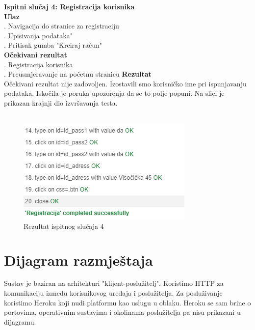 {			 \noindent \textbf{Ispitni slučaj 4: Registracija korisnika}
			 \\
			 \textbf{Ulaz}
			 \\
			 . Navigacija do stranice za registraciju \\
			 . Upisivanja podataka" \\
			 . Pritisak gumba "Kreiraj račun" \\
			 \textbf{Očekivani rezultat}
			 \\
			 . Registracija korisnika\\
			 . Preusmjeravanje na početnu stranicu
			 \textbf{Rezultat}
			 \\
			 \indent Očekivani rezultat nije zadovoljen. Izostavili smo korisničko ime pri ispunjavanju podataka. Iskočila je poruka upozorenja da se to polje popuni. Na slici je prikazan krajnji dio izvršavanja testa.
			 \\ \\
			 \begin{figure}[H]
			 	\centering
			 	\includegraphics[scale=0.7]{"slike/test10"}
			 	\caption{Rezultat ispitnog slučaja 4}
			 	\label{fig:rezultat-ispitnog-slucaja-10}
			 \end{figure}
		
		
		\section{Dijagram razmještaja}
			
			Sustav je baziran na arhitekturi "klijent-poslužitelj". Koristimo HTTP za komunikaciju između korisnikovog uređaja i poslužitelja. Za posluživanje koristimo Heroku koji nudi platformu kao uslugu u oblaku. Heroku se sam brine o portovima, operativnim sustavima i okolinama poslužitelja pa nisu prikazani u dijagramu.
			
}
